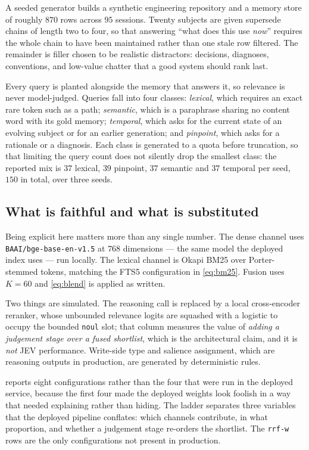 \documentclass[10pt,twocolumn]{article}
\begin{document}
A seeded generator builds a synthetic engineering repository and a memory store
of roughly $870$ rows across $95$ sessions. Twenty subjects are given supersede
chains of length two to four, so that answering ``what does this use \emph{now}''
requires the whole chain to have been maintained rather than one stale row
filtered. The remainder is filler chosen to be realistic distractors: decisions,
diagnoses, conventions, and low-value chatter that a good system should rank
last.

Every query is planted alongside the memory that answers it, so relevance is
never model-judged. Queries fall into four classes: \emph{lexical}, which
requires an exact rare token such as a path; \emph{semantic}, which is a
paraphrase sharing no content word with its gold memory; \emph{temporal}, which
asks for the current state of an evolving subject or for an earlier generation;
and \emph{pinpoint}, which asks for a rationale or a diagnosis. Each class is
generated to a quota before truncation, so that limiting the query count does not
silently drop the smallest class: the reported mix is $37$ lexical, $39$
pinpoint, $37$ semantic and $37$ temporal per seed, $150$ in total, over three
seeds.

\subsection{What is faithful and what is substituted}

Being explicit here matters more than any single number. The dense channel uses
\texttt{BAAI/bge-base-en-v1.5}\citep{ding2021bge} at $768$ dimensions --- the same
model the deployed index uses --- run locally. The lexical channel is Okapi
BM25\citep{robertson2009} over Porter-stemmed tokens, matching the FTS5
configuration in \cref{eq:bm25}. Fusion uses $K=60$ and \cref{eq:blend} is
applied as written.

Two things are simulated. The reasoning call is replaced by a local
cross-encoder reranker, whose unbounded relevance logits are squashed with a
logistic to occupy the bounded \texttt{noul} slot; that column measures the
value of \emph{adding a judgement stage over a fused shortlist}, which is the
architectural claim, and it is \emph{not} JEV performance. Write-side type and
salience assignment, which are reasoning outputs in production, are generated by
deterministic rules.

 reports eight configurations rather than the four that were run
in the deployed service, because the first four made the deployed weights look
foolish in a way that needed explaining rather than hiding. The ladder separates
three variables that the deployed pipeline conflates: which channels contribute,
in what proportion, and whether a judgement stage re-orders the shortlist. The
\texttt{rrf-w} rows are the only configurations not present in production.
\end{document}
